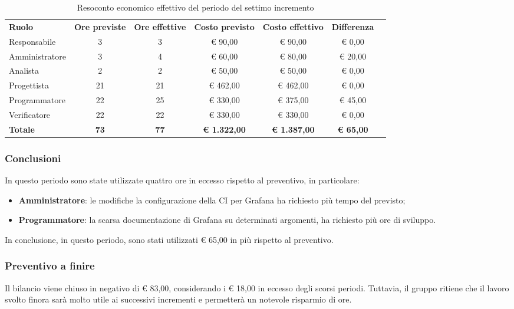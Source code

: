 \documentclass[../piano-di-progetto.tex]{subfiles}
\begin{document}
  \begin{table}[H]
    \centering
    \begin{tabular}{lcccccc}
      \rowcolor{lightgray}
      \textbf{Ruolo}  & \textbf{Ore previste} & \textbf{Ore effettive} & \textbf{Costo previsto} & \textbf{Costo effettivo} & \textbf{Differenza} \\
Responsabile    & 3           & 3           & € 90,00             & € 90,00             & € 0,00           \\
Amministratore  & 3           & 4           & € 60,00             & € 80,00             & € 20,00          \\
Analista        & 2           & 2           & € 50,00             & € 50,00             & € 0,00           \\
Progettista     & 21          & 21          & € 462,00            & € 462,00            & € 0,00           \\
Programmatore   & 22          & 25          & € 330,00            & € 375,00            & € 45,00          \\
Verificatore    & 22          & 22          & € 330,00            & € 330,00            & € 0,00           \\
\textbf{Totale} & \textbf{73} & \textbf{77} & \textbf{€ 1.322,00} & \textbf{€ 1.387,00} & \textbf{€ 65,00}
    \end{tabular}
    \caption{Resoconto economico effettivo del periodo del settimo incremento}
  \end{table}


\subsubsection{Conclusioni}
In questo periodo sono state utilizzate quattro ore in eccesso rispetto al preventivo, in particolare:
\begin{itemize}
    \item \textbf{Amministratore}: le modifiche la configurazione della CI per Grafana ha richiesto più tempo del previsto;
    \item \textbf{Programmatore}: la scarsa documentazione di Grafana su determinati argomenti, ha richiesto più ore di sviluppo.
\end{itemize}
In conclusione, in questo periodo, sono stati utilizzati € 65,00 in più rispetto al preventivo.

\subsubsection{Preventivo a finire}
Il bilancio viene chiuso in negativo di € 83,00, considerando i € 18,00 in eccesso degli scorsi periodi. Tuttavia, il gruppo ritiene che il lavoro svolto finora sarà molto utile ai successivi incrementi e permetterà un notevole risparmio di ore.
\end{document}
